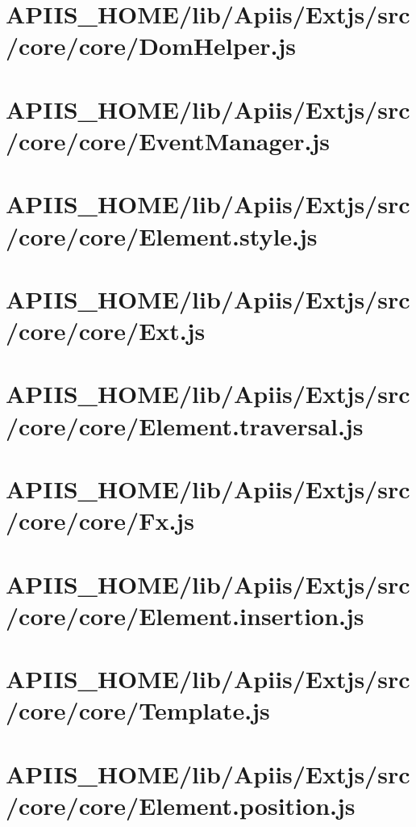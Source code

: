 \section{APIIS\_HOME/lib/Apiis/Extjs/src/core/core/DomHelper.js} 
\section{APIIS\_HOME/lib/Apiis/Extjs/src/core/core/EventManager.js} 
\section{APIIS\_HOME/lib/Apiis/Extjs/src/core/core/Element.style.js} 
\section{APIIS\_HOME/lib/Apiis/Extjs/src/core/core/Ext.js} 
\section{APIIS\_HOME/lib/Apiis/Extjs/src/core/core/Element.traversal.js} 
\section{APIIS\_HOME/lib/Apiis/Extjs/src/core/core/Fx.js} 
\section{APIIS\_HOME/lib/Apiis/Extjs/src/core/core/Element.insertion.js} 
\section{APIIS\_HOME/lib/Apiis/Extjs/src/core/core/Template.js} 
\section{APIIS\_HOME/lib/Apiis/Extjs/src/core/core/Element.position.js} 
